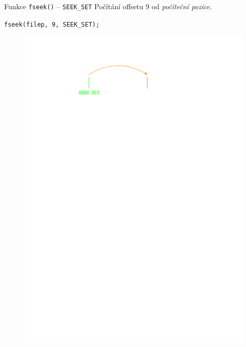 \documentclass[14pt,aspectratio=169]{beamer}
\begin{document}
    \begin{frame}{Funkce \texttt{fseek()} -- \texttt{SEEK\_SET}}
        Počítání offsetu $9$ od \emph{počíteční pozice}.
        \begin{center}
            \texttt{fseek(filep, 9, SEEK\_SET);}
        \end{center}
        \begin{figure}
            \centering
            \includegraphics[scale=1]{images/cursor_fseek3.pdf}
        \end{figure}
    \end{frame}
\end{document}
